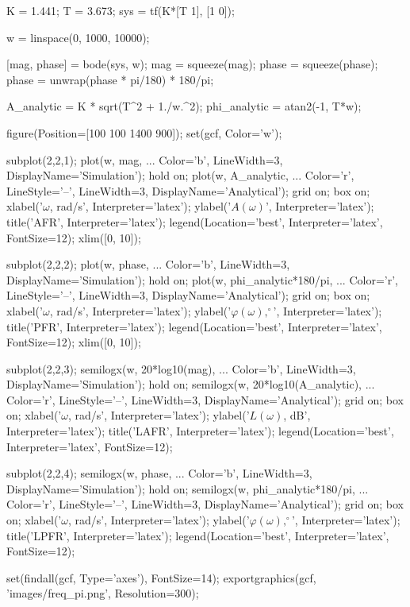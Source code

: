 \begin{matlabcode}
K = 1.441;
T = 3.673;
sys = tf(K*[T 1], [1 0]);

w = linspace(0, 1000, 10000);

[mag, phase] = bode(sys, w);    
mag = squeeze(mag); phase = squeeze(phase);
phase = unwrap(phase * pi/180) * 180/pi;

A_analytic = K * sqrt(T^2 + 1./w.^2);
phi_analytic = atan2(-1, T*w);

figure(Position=[100 100 1400 900]);
set(gcf, Color='w');

subplot(2,2,1);
plot(w, mag, ...
    Color='b', LineWidth=3, DisplayName='Simulation');
hold on;
plot(w, A_analytic, ...
    Color='r', LineStyle='--', LineWidth=3, DisplayName='Analytical');
grid on; box on;
xlabel('$\omega$, rad/s', Interpreter='latex');
ylabel('$A(\omega)$', Interpreter='latex');
title('AFR', Interpreter='latex');
legend(Location='best', Interpreter='latex', FontSize=12);
xlim([0, 10]);

subplot(2,2,2);
plot(w, phase, ...
    Color='b', LineWidth=3, DisplayName='Simulation');
hold on;
plot(w, phi_analytic*180/pi, ...
    Color='r', LineStyle='--', LineWidth=3, DisplayName='Analytical');
grid on; box on;
xlabel('$\omega$, rad/s', Interpreter='latex');
ylabel('$\varphi(\omega), ^\circ$', Interpreter='latex');
title('PFR', Interpreter='latex');
legend(Location='best', Interpreter='latex', FontSize=12);
xlim([0, 10]);

subplot(2,2,3);
semilogx(w, 20*log10(mag), ...
    Color='b', LineWidth=3, DisplayName='Simulation');
hold on;
semilogx(w, 20*log10(A_analytic), ...
    Color='r', LineStyle='--', LineWidth=3, DisplayName='Analytical');
grid on; box on;
xlabel('$\omega$, rad/s', Interpreter='latex');
ylabel('$L(\omega)$, dB', Interpreter='latex');
title('LAFR', Interpreter='latex');
legend(Location='best', Interpreter='latex', FontSize=12);

subplot(2,2,4);
semilogx(w, phase, ...
    Color='b', LineWidth=3, DisplayName='Simulation');
hold on;
semilogx(w, phi_analytic*180/pi, ...
    Color='r', LineStyle='--', LineWidth=3, DisplayName='Analytical');
grid on; box on;
xlabel('$\omega$, rad/s', Interpreter='latex');
ylabel('$\varphi(\omega), ^\circ$', Interpreter='latex');
title('LPFR', Interpreter='latex');
legend(Location='best', Interpreter='latex', FontSize=12);

set(findall(gcf, Type='axes'), FontSize=14);
exportgraphics(gcf, 'images/freq_pi.png', Resolution=300);
\end{matlabcode}
